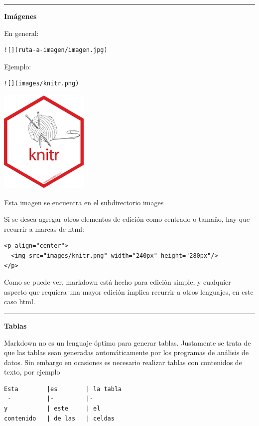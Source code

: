\documentclass[11pt,]{book}
\begin{document}
\begin{center}\rule{0.5\linewidth}{\linethickness}\end{center}

\textbf{Imágenes}

En general:

\begin{verbatim}
![](ruta-a-imagen/imagen.jpg)
\end{verbatim}

Ejemplo:

\begin{verbatim}
![](images/knitr.png)
\end{verbatim}

\includegraphics{images/knitr.png}

Esta imagen se encuentra en el subdirectorio images

Si se desea agregar otros elementos de edición como centrado o tamaño, hay que recurrir a marcas de html:

\begin{verbatim}
<p align="center">
  <img src="images/knitr.png" width="240px" height="280px"/>
</p>
\end{verbatim}

Como se puede ver, markdown está hecho para edición simple, y cualquier aspecto que requiera una mayor edición implica recurrir a otros lenguajes, en este caso html.

\begin{center}\rule{0.5\linewidth}{\linethickness}\end{center}

\textbf{Tablas}

Markdown no es un lenguaje óptimo para generar tablas. Justamente se trata de que las tablas sean generadas automáticamente por los programas de análisis de datos. Sin embargo en ocasiones es necesario realizar tablas con contenidos de texto, por ejemplo

\begin{verbatim}
Esta        |es        | la tabla
 -          |-         |-
y           | este     | el
contenido   | de las   | celdas
\end{verbatim}
\end{document}
